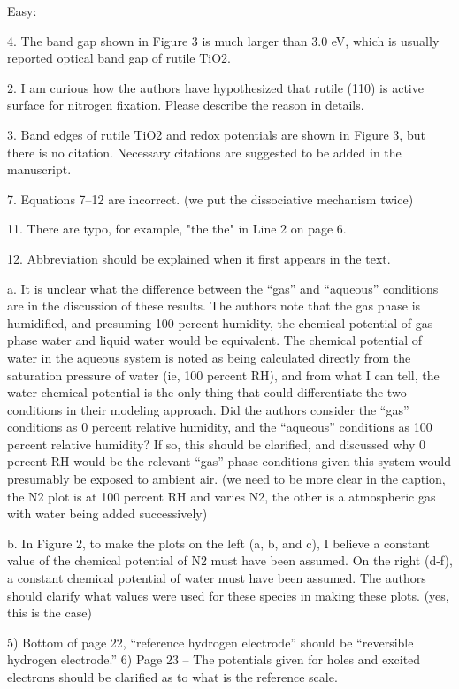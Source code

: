 Easy:

4. The band gap shown in Figure 3 is much larger than 3.0 eV, which is usually reported optical band gap of rutile TiO2.

2. I am curious how the authors have hypothesized that rutile (110) is active surface for nitrogen fixation. Please describe the reason in details. %

3. Band edges of rutile TiO2 and redox potentials are shown in Figure 3, but there is no citation. Necessary citations are suggested to be added in the manuscript. %

7. Equations 7–12 are incorrect. (we put the dissociative mechanism twice) %

11. There are typo, for example, "the the" in Line 2 on page 6. %

12. Abbreviation should be explained when it first appears in the text.

a.      It is unclear what the difference between the “gas” and “aqueous” conditions are in the discussion of these results.  The authors note that the gas phase is humidified, and presuming 100 percent humidity, the chemical potential of gas phase water and liquid water would be equivalent. The chemical potential of water in the aqueous system is noted as being calculated directly from the saturation pressure of water (ie, 100 percent RH), and from what I can tell, the water chemical potential is the only thing that could differentiate the two conditions in their modeling approach.   Did the authors consider the “gas” conditions as 0 percent relative humidity, and the “aqueous” conditions as 100 percent relative humidity?  If so, this should be clarified, and discussed why 0 percent RH would be the relevant “gas” phase conditions given this system would presumably be exposed to ambient air. (we need to be more clear in the caption, the N2 plot is at 100 percent RH and varies N2, the other is a atmospheric gas with water being added successively) %

b.      In Figure 2, to make the plots on the left (a, b, and c), I believe a constant value of the chemical potential of N2 must have been assumed.  On the right (d-f), a constant chemical potential of water must have been assumed.  The authors should clarify what values were used for these species in making these plots. (yes, this is the case) %


5)       Bottom of page 22, “reference hydrogen electrode” should be “reversible hydrogen electrode.” %
6)      Page 23 – The potentials given for holes and excited electrons should be clarified as to what is the reference scale. %

